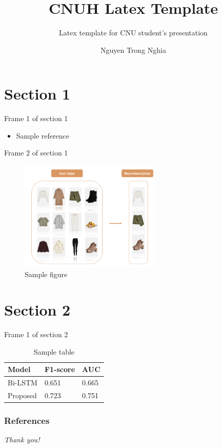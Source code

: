 \documentclass[fleqn]{beamer}
\title{CNUH Latex Template}
\subtitle{Latex template for CNU student's presentation}
\author{Nguyen Trong Nghia}
\institute[Chonnam National University]{ Adviser:}
\begin{document}
\begin{frame}
  \titlepage
\end{frame}



\section{Section 1}
\begin{frame}{Frame 1 of section 1}
    \begin{itemize}
        \item Sample reference \cite{Davis}
    \end{itemize}
\end{frame}
    
\begin{frame}{Frame 2 of section 1}
    \begin{figure}
        \centering
        \includegraphics[width=0.6\textwidth]{img/Fashion_sys.png}
        \caption{Sample figure}
        \label{fig:my_label}
    \end{figure}
\end{frame}

\section{Section 2}
\begin{frame}{Frame 1 of section 2}
    \begin{table}[]
    \begin{tabular}{@{}lll@{}}
    \toprule
    Model    & F1-score & AUC   \\ \midrule
    Bi-LSTM  & 0.651    & 0.665 \\
    Proposed & 0.723    & 0.751 \\ \bottomrule
    \end{tabular}
    \caption{Sample table}
    \end{table}
\end{frame}

\begin{frame}
        \frametitle{References}
        
        
\end{frame}
\begin{frame}{}
  \centering \Large
  \emph{Thank you!}
\end{frame}
\end{document}
